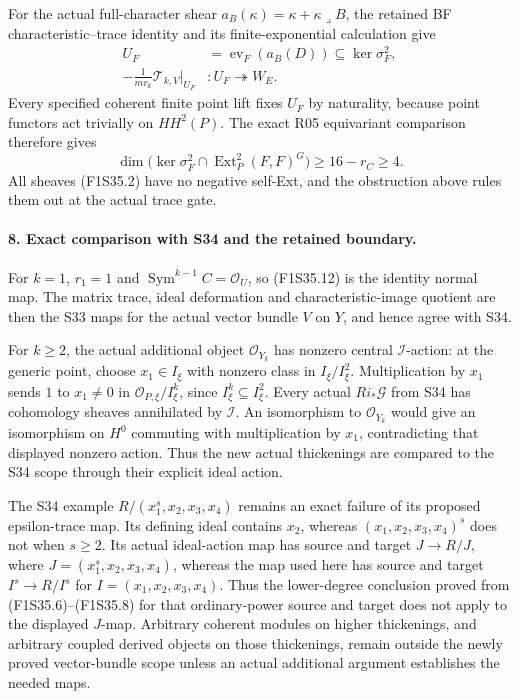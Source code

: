 For the actual full-character shear
$a_B(\kappa)=\kappa+\kappa\mathbin{\lrcorner}B$,
the retained BF characteristic--trace identity
and its finite-exponential calculation give
\[
\begin{split}
 U_F&=\operatorname{ev}_F(a_B(D))
                                      \subseteq\ker\sigma_F^2,\\
 -\frac1{m r_k}\mathcal T_{k,V}|_{U_F}
                        &:U_F\twoheadrightarrow W_E.
\end{split}
 \tag{F1S35.24}
\]
Every specified coherent finite point lift
fixes $U_F$ by naturality, because point
functors act trivially on $HH^2(P)$.
The exact R05 equivariant comparison
therefore gives
\[
 \dim\bigl(\ker\sigma_F^2\cap
                   \operatorname{Ext}^2_P(F,F)^G\bigr)
                           \ge16-r_C\ge4.
 \tag{F1S35.25}
\]
All sheaves (F1S35.2) have no negative
self-Ext, and the obstruction above rules
them out at the actual trace gate.

\paragraph{8. Exact comparison with S34 and the retained boundary.}
For $k=1$, $r_1=1$ and
$\operatorname{Sym}^{k-1}C=\mathcal O_U$,
so (F1S35.12) is the identity normal map.
The matrix trace, ideal deformation and
characteristic-image quotient are then
the S33 maps for the actual vector bundle
$V$ on $Y$, and hence agree with S34.

For $k\ge2$, the actual additional object
$\mathcal O_{Y_k}$ has nonzero central
$\mathcal I$-action: at the generic point,
choose $x_1\in I_\xi$ with nonzero class
in $I_\xi/I_\xi^2$.
Multiplication by $x_1$ sends $1$ to
$x_1\ne0$ in $\mathcal O_{P,\xi}/I_\xi^k$,
since $I_\xi^k\subseteq I_\xi^2$.
Every actual $Ri_*\mathcal G$ from S34 has
cohomology sheaves annihilated by
$\mathcal I$. An isomorphism to
$\mathcal O_{Y_k}$ would give an isomorphism
on $H^0$ commuting with multiplication by
$x_1$, contradicting that displayed
nonzero action. Thus the new actual
thickenings are compared to the S34
scope through their explicit ideal action.

The S34 example
$R/(x_1^s,x_2,x_3,x_4)$ remains an exact
failure of its proposed epsilon-trace
map. Its defining ideal contains $x_2$,
whereas $(x_1,x_2,x_3,x_4)^s$ does not
when $s\ge2$. Its actual ideal-action map has
source and target $J\longrightarrow R/J$,
where $J=(x_1^s,x_2,x_3,x_4)$, whereas
the map used here has source and target
$I^s\longrightarrow R/I^s$ for
$I=(x_1,x_2,x_3,x_4)$. Thus the lower-degree
conclusion proved from (F1S35.6)--(F1S35.8)
for that ordinary-power source and target
does not apply to the displayed $J$-map.
Arbitrary coherent modules on higher
thickenings, and arbitrary coupled
derived objects on those thickenings,
remain outside the newly proved vector-bundle
scope unless an actual additional argument
establishes the needed maps.

